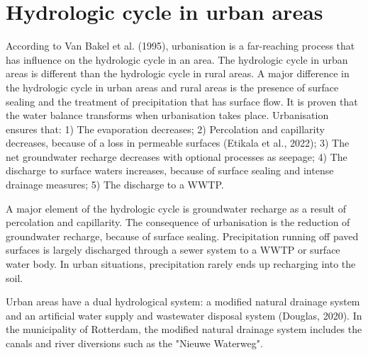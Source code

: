 \section{Hydrologic cycle in urban areas}
According to Van Bakel et al. (1995), urbanisation is a far-reaching process that has influence on the hydrologic cycle in an area. The hydrologic cycle in urban areas is different than the hydrologic cycle in rural areas. A major difference in the hydrologic cycle in urban areas and rural areas is the presence of surface sealing and the treatment of precipitation that has surface flow. It is proven that the water balance transforms when urbanisation takes place. Urbanisation ensures that: 1) The evaporation decreases; 2) Percolation and capillarity decreases, because of a loss in permeable surfaces (Etikala et al., 2022); 3) The net groundwater recharge decreases with optional processes as seepage; 4) The discharge to surface waters increases, because of surface sealing and intense drainage measures; 5) The discharge to a WWTP. 

A major element of the hydrologic cycle is groundwater recharge as a result of percolation and capillarity. The consequence of urbanisation is the reduction of groundwater recharge, because of surface sealing. Precipitation running off paved surfaces is largely discharged through a sewer system to a WWTP or surface water body. In urban situations, precipitation rarely ends up recharging into the soil. 

Urban areas have a dual hydrological system: a modified natural drainage system and an artificial water supply and wastewater disposal system (Douglas, 2020). In the municipality of Rotterdam, the modified natural drainage system includes the canals and river diversions such as the "Nieuwe Waterweg". 


